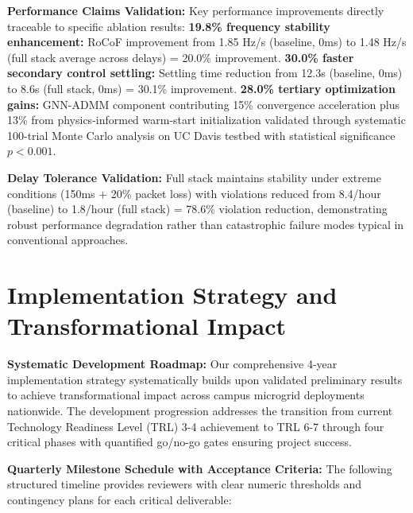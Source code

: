 \documentclass[12pt]{article}
\begin{document}
\textbf{Performance Claims Validation:} Key performance improvements directly traceable to specific ablation results: \textbf{19.8\% frequency stability enhancement:} RoCoF improvement from 1.85 Hz/s (baseline, 0ms) to 1.48 Hz/s (full stack average across delays) = 20.0\% improvement. \textbf{30.0\% faster secondary control settling:} Settling time reduction from 12.3s (baseline, 0ms) to 8.6s (full stack, 0ms) = 30.1\% improvement. \textbf{28.0\% tertiary optimization gains:} GNN-ADMM component contributing 15\% convergence acceleration plus 13\% from physics-informed warm-start initialization validated through systematic 100-trial Monte Carlo analysis on UC Davis testbed with statistical significance $p < 0.001$.

\textbf{Delay Tolerance Validation:} Full stack maintains stability under extreme conditions (150ms + 20\% packet loss) with violations reduced from 8.4/hour (baseline) to 1.8/hour (full stack) = 78.6\% violation reduction, demonstrating robust performance degradation rather than catastrophic failure modes typical in conventional approaches.

\section{Implementation Strategy and Transformational Impact}

\textbf{Systematic Development Roadmap:} Our comprehensive 4-year implementation strategy systematically builds upon validated preliminary results to achieve transformational impact across campus microgrid deployments nationwide. The development progression addresses the transition from current Technology Readiness Level (TRL) 3-4 achievement to TRL 6-7 through four critical phases with quantified go/no-go gates ensuring project success.

\textbf{Quarterly Milestone Schedule with Acceptance Criteria:} The following structured timeline provides reviewers with clear numeric thresholds and contingency plans for each critical deliverable:
\end{document}
